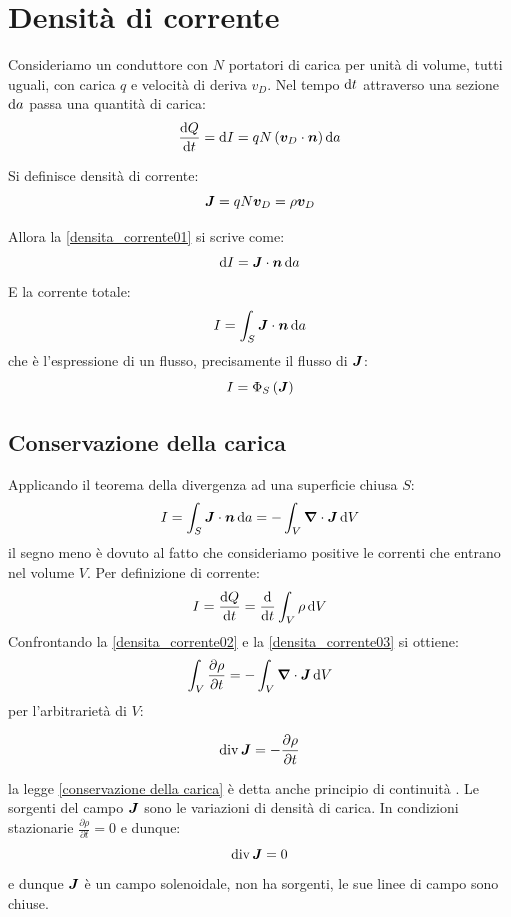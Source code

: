 \section{Densità di corrente}
Consideriamo un conduttore con $N$ portatori di carica per unità di volume, tutti uguali, con carica $q$ e velocità di deriva $v_D$. Nel tempo $\mathrm{d} t$ attraverso una sezione $\mathrm{d} a$ passa una quantità di carica:
\begin{equation}
  \frac{\mathrm{d} Q}{\mathrm{d} t}=\mathrm{d} I=qN\left(\boldsymbol{v}_D\cdot \boldsymbol{n}\right)\mathrm{d} a
  \label{densita_corrente01}
\end{equation}
\begin{Def}
  Si definisce densità di corrente:
  \begin{equation}
    \boldsymbol{J}=qN\boldsymbol{v}_D = \rho \boldsymbol{v}_D
  \end{equation}
\end{Def}
Allora la \eqref{densita_corrente01} si scrive come:
\[\mathrm{d} I=\boldsymbol{J}\cdot\boldsymbol{n}\,\mathrm{d} a\]
E la corrente totale:
\begin{equation}
  I=\int_S \boldsymbol{J}\cdot \boldsymbol{n}\,\mathrm{d} a
\end{equation}
che è l'espressione di un flusso, precisamente il flusso di $\boldsymbol{J}$:
\begin{equation}
  I=\Phi_S\left(\boldsymbol{J}\right)
\end{equation}
\subsection{Conservazione della carica}
Applicando il teorema della divergenza ad una superficie chiusa $S$:
\begin{equation}
  I=\int_S \boldsymbol{J}\cdot\boldsymbol{n}\,\mathrm{d} a=-\int_V\boldsymbol{\nabla}\cdot\boldsymbol{J}\,\mathrm{d} V
  \label{densita_corrente02}
\end{equation}
il segno meno è dovuto al fatto che consideriamo positive le correnti che entrano nel volume $V$. Per definizione di corrente:
\begin{equation}
  I=\frac{\mathrm{d} Q}{\mathrm{d} t}=\frac{\mathrm{d}}{\mathrm{d} t}\int_V\rho\,\mathrm{d} V
  \label{densita_corrente03}
\end{equation}
Confrontando la \eqref{densita_corrente02} e la \eqref{densita_corrente03} si ottiene:
\[\int_V\frac{\partial \rho}{\partial t}=-\int_V\boldsymbol{\nabla}\cdot\boldsymbol{J}\,\mathrm{d} V\]
per l'arbitrarietà di $V$:
\begin{legge}
  \begin{equation}
    \operatorname{div}\boldsymbol{J}=-\frac{\partial \rho}{\partial t}
  \end{equation}
  \label{conservazione della carica}
\end{legge}
la legge \eqref{conservazione della carica} è detta anche principio di continuità . Le sorgenti del campo $\boldsymbol{J}$ sono le variazioni di densità di carica. In condizioni stazionarie $\frac{\partial\rho}{\partial t}=0$ e dunque:
\[\operatorname{div} \boldsymbol{J}=0\]
e dunque $\boldsymbol{J}$ è un campo solenoidale, non ha sorgenti, le sue linee di campo sono chiuse.
